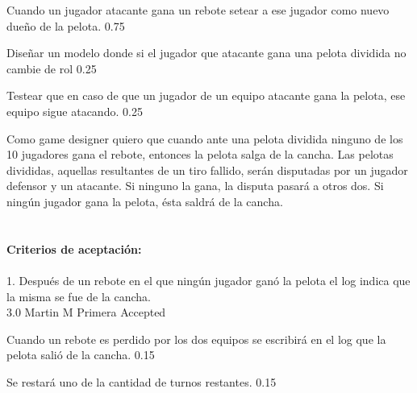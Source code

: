 		{Cuando un jugador atacante gana un rebote setear a ese jugador como nuevo dueño de la pelota.} %
		{} %
		{0.75} %
		{} %
		{} %
		{} %

		{Diseñar un modelo donde si el jugador que atacante gana una pelota dividida no cambie de rol} %
		{} %
		{0.25} %
		{} %
		{} %
		{} %

		{Testear que en caso de que un jugador de un equipo atacante gana la pelota, ese equipo sigue atacando.} %
		{} %
		{0.25} %
		{} %
		{} %
		{} %
\vspace{20pt}


	{Como game designer quiero que cuando ante una pelota dividida ninguno de los 10 jugadores gana el rebote, entonces la pelota salga de la cancha.} %
	{Las pelotas divididas, aquellas resultantes de un tiro fallido, serán disputadas por un jugador defensor y un atacante. Si ninguno la gana, la disputa pasará a otros dos. Si ningún jugador gana la pelota, ésta saldrá de la cancha. \\
  \\
  \\
\textbf{Criterios de aceptación:}\\
  \\
1. Después de un rebote en el que ningún jugador ganó la pelota el log indica que la misma se fue de la cancha. \\
} %
	{} %
	{3.0} %
	{Martin M} %
	{Primera} %
	{Accepted} %

		{Cuando un rebote es perdido por los dos equipos se escribirá en el log que la pelota salió de la cancha.} %
		{} %
		{0.15} %
		{} %
		{} %
		{} %

		{Se restará uno de la cantidad de turnos restantes.} %
		{} %
		{0.15} %
		{} %
		{} %
		{} %

